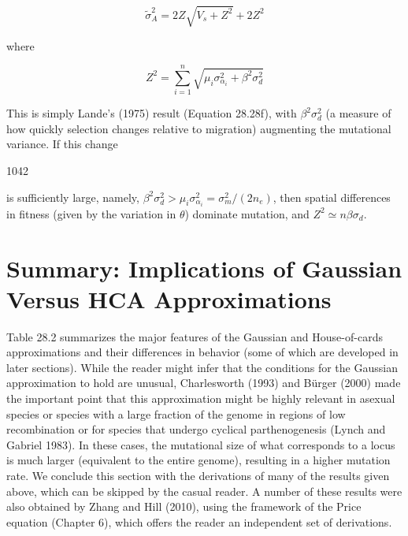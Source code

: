 \documentclass{article}
\begin{document}
\begin{equation}
\widetilde{\sigma}_{A}^{2}=2Z\sqrt{V_{s}+Z^{2}}+2Z^{2}
\tag{28.20a}
\label{eq:28_20a}
\end{equation}

where

\begin{equation}
Z^{2}=\sum_{i=1}^{n}\sqrt{\mu_{i}\sigma_{\alpha_{i}}^{2}+\beta^{2}\sigma_{d}^{2}}
\tag{28.20b}
\label{eq:28_20b}
\end{equation}

This is simply Lande’s (1975) result (Equation 28.28f), with  $ \beta^{2}\sigma_{d}^{2} $ (a measure of how quickly selection changes relative to migration) augmenting the mutational variance. If this change

1042

is sufficiently large, namely,  $ \beta^{2}\sigma_{d}^{2} > \mu_{i}\sigma_{\alpha_{i}}^{2} = \sigma_{m}^{2}/(2n_{e}) $, then spatial differences in fitness (given by the variation in  $ \theta $) dominate mutation, and  $ Z^{2} \simeq n\beta\sigma_{d} $.

\section{Summary: Implications of Gaussian Versus HCA Approximations}
Table 28.2 summarizes the major features of the Gaussian and House-of-cards approximations and their differences in behavior (some of which are developed in later sections). While the reader might infer that the conditions for the Gaussian approximation to hold are unusual, Charlesworth (1993) and Bürger (2000) made the important point that this approximation might be highly relevant in asexual species or species with a large fraction of the genome in regions of low recombination or for species that undergo cyclical parthenogenesis (Lynch and Gabriel 1983). In these cases, the mutational size of what corresponds to a locus is much larger (equivalent to the entire genome), resulting in a higher mutation rate. We conclude this section with the derivations of many of the results given above, which can be skipped by the casual reader. A number of these results were also obtained by Zhang and Hill (2010), using the framework of the Price equation (Chapter 6), which offers the reader an independent set of derivations.
\end{document}

